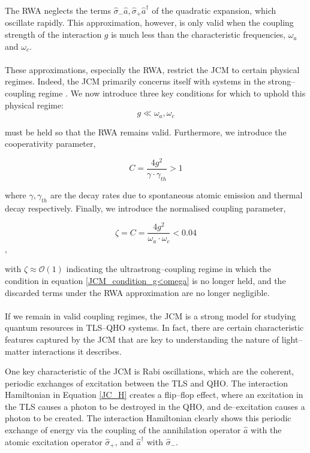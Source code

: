 \documentclass[12pt]{article}
\begin{document}
The RWA neglects the terms $\hat{\sigma}_{-}\hat{a}, \hat{\sigma}_{+}\hat{a}^\dagger$ of the quadratic expansion, which oscillate rapidly. This approximation, however, is only valid when the coupling strength of the interaction $g$ is much less than the characteristic frequencies, $\omega_a$ and $\omega_c$. \\
\\
These approximations, especially the RWA, restrict the JCM to certain physical regimes. Indeed, the JCM primarily concerns itself with systems in the strong--coupling regime \cite{General2024-JCM_relevance}. We now introduce three key conditions for which to uphold this physical regime:
\begin{equation} \label{JCM_condition_g<omega}
    g \ll \omega_a, \omega_c 
\end{equation} 

must be held so that the RWA remains valid. Furthermore, we introduce the cooperativity parameter,

\begin{equation} \label{JCM_condition_cooperativity}
    C = \frac{4g^2}{\gamma\cdot\gamma_{\scriptscriptstyle th}} > 1
\end{equation}

where $\gamma, \gamma_{\scriptscriptstyle th}$ are the decay rates due to spontaneous atomic emission and thermal decay respectively. Finally, we introduce the normalised coupling parameter, 

\begin{equation} \label{JCM_condition_norm_coupling}
    \zeta = C = \frac{4g^2}{\omega_a\cdot\omega_c} < 0.04
\end{equation}, 

with $\zeta \approx \mathcal{O}(1)$ indicating the ultrastrong--coupling regime in which the condition in equation \eqref{JCM_condition_g<omega} is no longer held, and the discarded terms under the RWA approximation are no longer negligible.\\
\\
If we remain in valid coupling regimes, the JCM is a strong model for studying quantum resources in TLS--QHO systems. In fact, there are certain characteristic features captured by the JCM that are key to understanding the nature of light--matter interactions it describes. 

One key characteristic of the JCM is Rabi oscillations, which are the coherent, periodic exchanges of excitation between the TLS and QHO. The interaction Hamiltonian in Equation \eqref{JC_H} creates a flip--flop effect, where an excitation in the TLS causes a photon to be destroyed in the QHO, and de--excitation causes a photon to be created. The interaction Hamiltonian clearly shows this periodic exchange of energy via the coupling of the annihilation operator $\hat{a}$ with the atomic excitation operator $\hat{\sigma}_+$, and $\hat{a}^\dagger$ with $\hat{\sigma}_-$.
\end{document}
